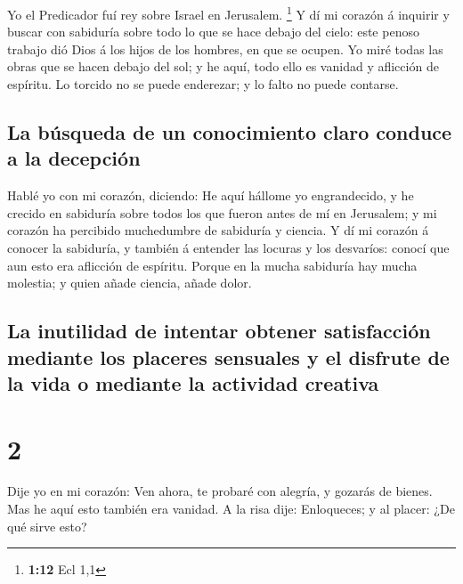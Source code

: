  Yo el Predicador fuí rey sobre Israel en Jerusalem.
\footnote{\textbf{1:12} Ecl 1,1}  Y dí mi corazón á
inquirir y buscar con sabiduría sobre todo lo que se hace debajo del
cielo: este penoso trabajo dió Dios á los hijos de los hombres, en que
se ocupen.  Yo miré todas las obras que se hacen debajo del
sol; y he aquí, todo ello es vanidad y aflicción de espíritu.
 Lo torcido no se puede enderezar; y lo falto no puede
contarse.

\hypertarget{la-buxfasqueda-de-un-conocimiento-claro-conduce-a-la-decepciuxf3n}{%
\subsection{La búsqueda de un conocimiento claro conduce a la
decepción}\label{la-buxfasqueda-de-un-conocimiento-claro-conduce-a-la-decepciuxf3n}}

 Hablé yo con mi corazón, diciendo: He aquí hállome yo
engrandecido, y he crecido en sabiduría sobre todos los que fueron antes
de mí en Jerusalem; y mi corazón ha percibido muchedumbre de sabiduría y
ciencia.  Y dí mi corazón á conocer la sabiduría, y también
á entender las locuras y los desvaríos: conocí que aun esto era
aflicción de espíritu.  Porque en la mucha sabiduría hay
mucha molestia; y quien añade ciencia, añade dolor.

\hypertarget{la-inutilidad-de-intentar-obtener-satisfacciuxf3n-mediante-los-placeres-sensuales-y-el-disfrute-de-la-vida-o-mediante-la-actividad-creativa}{%
\subsection{La inutilidad de intentar obtener satisfacción mediante los
placeres sensuales y el disfrute de la vida o mediante la actividad
creativa}\label{la-inutilidad-de-intentar-obtener-satisfacciuxf3n-mediante-los-placeres-sensuales-y-el-disfrute-de-la-vida-o-mediante-la-actividad-creativa}}

\hypertarget{section-1}{%
\section{2}\label{section-1}}

 Dije yo en mi corazón: Ven ahora, te probaré con alegría, y
gozarás de bienes. Mas he aquí esto también era vanidad.  A
la risa dije: Enloqueces; y al placer: ¿De qué sirve esto?

